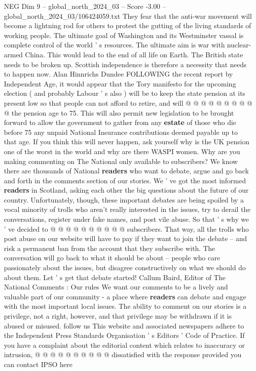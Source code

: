\begin{textsample}{NEG Dim 9 – global\_north\_2024\_03 – Score -3.00 – global\_north\_2024\_03/106424059.txt}
They fear that the anti-war movement will become a lightning rod for others to protest the gutting of the living standards of working people.
The ultimate goal of Washington and its Westminster vassal is complete control of the world ' s resources.
The ultimate aim is war with nuclear-armed China.
This would lead to the end of all life on Earth.
The British state needs to be broken up.
Scottish independence is therefore a necessity that needs to happen now.
Alan Hinnrichs Dundee FOLLOWING the recent report by Independent Age, it would appear that the Tory manifesto for the upcoming election ( and probably Labour ' s also ) will be to keep the state pension at its present low so that people can not afford to retire, and will @ @ @ @ @ @ @ @ @ @ the pension age to 75.
This will also permit new legislation to be brought forward to allow the government to gather from any \textbf{estate} of those who die before 75 any unpaid National Insurance contributions deemed payable up to that age.
If you think this will never happen, ask yourself why is the UK pension one of the worst in the world and why are there WASPI women.
Why are you making commenting on The National only available to subscribers?
We know there are thousands of National \textbf{readers} who want to debate, argue and go back and forth in the comments section of our stories.
We ' ve got the most informed \textbf{readers} in Scotland, asking each other the big questions about the future of our country.
Unfortunately, though, these important debates are being spoiled by a vocal minority of trolls who aren't really interested in the issues, try to derail the conversations, register under fake names, and post vile abuse.
So that ' s why we ' ve decided to @ @ @ @ @ @ @ @ @ @ subscribers.
That way, all the trolls who post abuse on our website will have to pay if they want to join the debate -- and risk a permanent ban from the account that they subscribe with.
The conversation will go back to what it should be about -- people who care passionately about the issues, but disagree constructively on what we should do about them.
Let ' s get that debate started!
Callum Baird, Editor of The National Comments : Our rules We want our comments to be a lively and valuable part of our community - a place where \textbf{readers} can debate and engage with the most important local issues.
The ability to comment on our stories is a privilege, not a right, however, and that privilege may be withdrawn if it is abused or misused. follow us This website and associated newspapers adhere to the Independent Press Standards Organisation ' s Editors ' Code of Practice.
If you have a complaint about the editorial content which relates to inaccuracy or intrusion, @ @ @ @ @ @ @ @ @ @ dissatisfied with the response provided you can contact IPSO here

\end{textsample}

